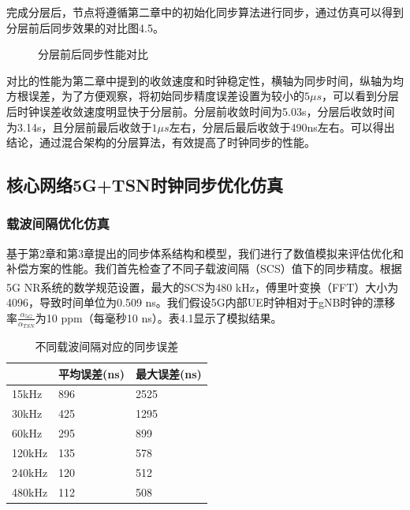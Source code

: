 \documentclass[UTF8,a4paper,12pt]{ctexart}
\numberwithin{equation}{section}
\begin{document}
完成分层后，节点将遵循第二章中的初始化同步算法进行同步，通过仿真可以得到分层前后同步效果的对比图4.5。
\begin{figure}[H] 
	\caption{分层前后同步性能对比}
\end{figure}

对比的性能为第二章中提到的收敛速度和时钟稳定性，横轴为同步时间，纵轴为均方根误差，为了方便观察，将初始同步精度误差设置为较小的$5\mu s$，可以看到分层后时钟误差收敛速度明显快于分层前。分层前收敛时间为5.03s，分层后收敛时间为3.14s，且分层前最后收敛于$1\mu s$左右，分层后最后收敛于490ns左右。可以得出结论，通过混合架构的分层算法，有效提高了时钟同步的性能。
\subsection{核心网络5G+TSN时钟同步优化仿真}
\subsubsection{载波间隔优化仿真}
基于第2章和第3章提出的同步体系结构和模型，我们进行了数值模拟来评估优化和补偿方案的性能。我们首先检查了不同子载波间隔（SCS）值下的同步精度。根据5G NR系统的数学规范设置\textsuperscript{\cite{access2015requirements}}，最大的SCS为480 kHz，傅里叶变换（FFT）大小为4096，导致时间单位为0.509 ns。我们假设5G内部UE时钟相对于gNB时钟的漂移率$\frac{\alpha_{5G}}{\alpha_{TSN}}$为10 ppm（每毫秒10 ns）。表4.1显示了模拟结果。

\begin{table}[!htb]
	\centering
	\caption{不同载波间隔对应的同步误差}
	\label{tab1}
	\begin{tabular}{l|l|l}
		\hline
		& \textbf{平均误差(ns)}& \textbf{最大误差(ns)} \\
		\hline
		15kHz 
		& 896
		& 2525 \\
		\hline
		30kHz
		& 425
		& 1295 \\
		\hline
		60kHz
		& 295
		& 899 \\
		\hline
		120kHz
		& 135
		& 578 \\
		\hline
		240kHz
		& 120
		& 512 \\
		\hline
		480kHz
		& 112
		& 508 \\
		\hline
	\end{tabular}
\end{table}
\end{document}
